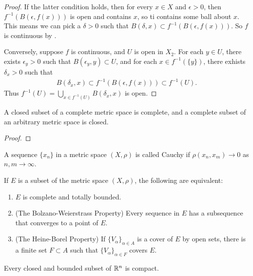 \begin{proof}
    If the latter condition holds, then for every $x \in X$ and $\epsilon > 0$, then $f^{-1} \left( B(\epsilon, f(x)) \right)$ is open and contains $x$, so ti contains some ball about $x$.
    This means we can pick a $\delta > 0$ such that $B(\delta, x) \subset f^{-1}\left( B(\epsilon, f(x)) \right)$.
    So $f$ is continuous by .

    Conversely, suppose $f$ is continuous, and $U$ is open in $X_2$.
    For each $y \in U$, there exists $\epsilon_y > 0$ such that $B(\epsilon_y, y) \subset U$, and for each $x \in f^{-1}(\{ y \})$, there exhists $\delta_x > 0$ such that 
    \begin{align}
        B(\delta_x, x) \subset f^{-1}\left( B(\epsilon, f(x)) \right) \subset f^{-1}(U).
    \end{align}
    Thus $f^{-1}(U) = \bigcup_{x \in f^{-1}(U)} B(\delta_x, x)$ is open.
\end{proof}

\begin{proposition}
    A closed subset of a complete metric space is complete, and a complete subset of an arbitrary metric space is closed.
\end{proposition}

\begin{proof}
    
\end{proof}

\begin{definition}
    A sequence $\{x_n\}$ in a metric space $(X, \rho)$ is called Cauchy if $\rho(x_n, x_m) \to 0$ as $n, m\to \infty$.
\end{definition}

\begin{theorem}
    If $E$ is a subset of the metric space $(X, \rho)$, the following are equivalent:
    \begin{enumerate}
        \item $E$ is complete and totally bounded.
        \item (The Bolzano-Weierstrass Property) Every sequence in $E$ has a subsequence that converges to a point of $E$.
        \item (The Heine-Borel Property) If $\{ V_{\alpha} \}_{\alpha \in A}$ is a cover of $E$ by open sets, there is a finite set $F \subset A$ such that $\{ V_{\alpha} \}_{\alpha \in F}$ covers $E$.
    \end{enumerate}
\end{theorem}

\begin{theorem}
    Every closed and bounded subset of $\mathbb{R}^n$ is compact.
\end{theorem}